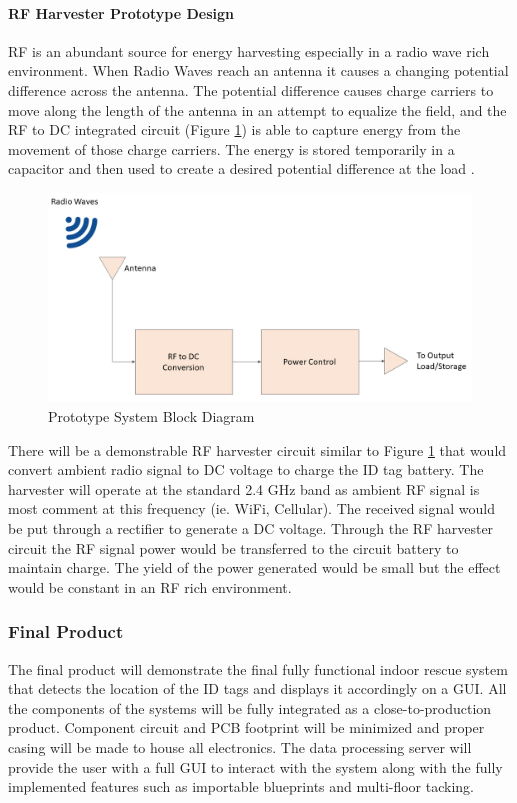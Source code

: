 \break
\paragraph{RF Harvester Prototype Design}
RF is an abundant source for energy harvesting especially in a radio wave rich environment. When Radio Waves reach an antenna it causes a changing potential difference across the antenna. The potential difference causes charge carriers to move along the length of the antenna in an attempt to equalize the field, and the RF to \Gls{DC} integrated circuit (Figure \ref{fig:rfh}) is able to capture energy from the movement of those charge carriers. The energy is stored temporarily in a capacitor and then used to create a desired potential difference at the load \cite{R5}.
\begin{figure}[h!]
    \centering
    \includegraphics[width=\linewidth]{./images/rf_harvest.png}
    \caption{Prototype System Block Diagram}
    \label{fig:rfh}
\end{figure}

\bigskip
There will be a demonstrable RF harvester circuit similar to Figure \ref{fig:rfh} that would convert ambient radio signal to DC voltage to charge the ID tag battery. The harvester will operate at the standard 2.4 GHz band as ambient RF signal is most comment at this frequency (ie. WiFi, Cellular). The received signal would be put through a rectifier to generate a DC voltage. Through the RF harvester circuit the RF signal power would be transferred to the circuit battery to maintain charge. The yield of the power generated would be small but the effect would be constant in an RF rich environment.

\break
\subsubsection{Final Product}
The final product will demonstrate the final fully functional indoor rescue system that detects the location of the ID tags and displays it accordingly on a GUI. All the components of the systems will be fully integrated as a close-to-production product. Component circuit and \Gls{PCB} footprint will be minimized and proper casing will be made to house all electronics. The data processing server will provide the user with a full GUI to interact with the system along with the fully implemented features such as importable blueprints and multi-floor tacking.

